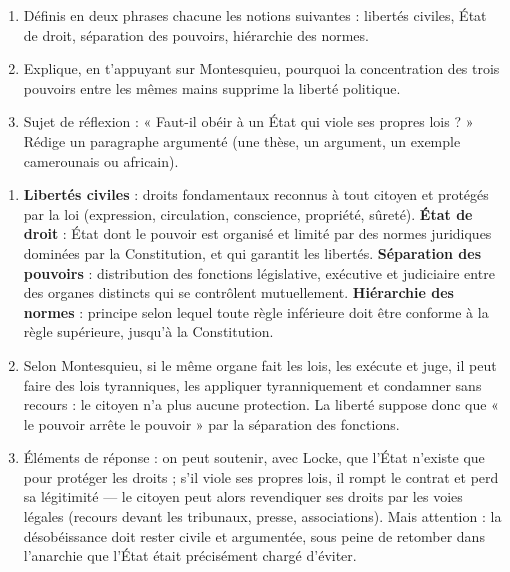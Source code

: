 \documentclass[11pt]{article}
\begin{document}
\begin{exercice}
\begin{enumerate}
\item Définis en deux phrases chacune les notions suivantes : libertés civiles, État de droit, séparation des pouvoirs, hiérarchie des normes.
\item Explique, en t'appuyant sur Montesquieu, pourquoi la concentration des trois pouvoirs entre les mêmes mains supprime la liberté politique.
\item Sujet de réflexion : « Faut-il obéir à un État qui viole ses propres lois ? » Rédige un paragraphe argumenté (une thèse, un argument, un exemple camerounais ou africain).
\end{enumerate}
\end{exercice}

\begin{corrige}[Exercice]
\begin{enumerate}
\item \textbf{Libertés civiles} : droits fondamentaux reconnus à tout citoyen et protégés par la loi (expression, circulation, conscience, propriété, sûreté). \textbf{État de droit} : État dont le pouvoir est organisé et limité par des normes juridiques dominées par la Constitution, et qui garantit les libertés. \textbf{Séparation des pouvoirs} : distribution des fonctions législative, exécutive et judiciaire entre des organes distincts qui se contrôlent mutuellement. \textbf{Hiérarchie des normes} : principe selon lequel toute règle inférieure doit être conforme à la règle supérieure, jusqu'à la Constitution.
\item Selon Montesquieu, si le même organe fait les lois, les exécute et juge, il peut faire des lois tyranniques, les appliquer tyranniquement et condamner sans recours : le citoyen n'a plus aucune protection. La liberté suppose donc que « le pouvoir arrête le pouvoir » par la séparation des fonctions.
\item Éléments de réponse : on peut soutenir, avec Locke, que l'État n'existe que pour protéger les droits ; s'il viole ses propres lois, il rompt le contrat et perd sa légitimité — le citoyen peut alors revendiquer ses droits par les voies légales (recours devant les tribunaux, presse, associations). Mais attention : la désobéissance doit rester civile et argumentée, sous peine de retomber dans l'anarchie que l'État était précisément chargé d'éviter.
\end{enumerate}
\end{corrige}
\end{document}
